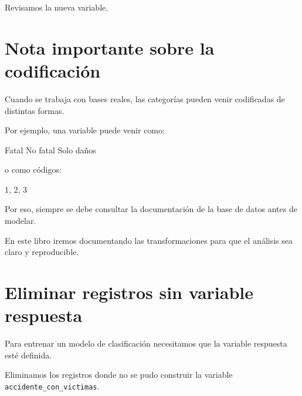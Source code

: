 \documentclass[
  11pt,
  letterpaper,
]{book}
\newenvironment{Shaded}{\begin{snugshade}}{\end{snugshade}}
\newcommand{\AttributeTok}[1]{\textcolor[rgb]{0.40,0.45,0.13}{#1}}
\newcommand{\ControlFlowTok}[1]{\textcolor[rgb]{0.00,0.23,0.31}{\textbf{#1}}}
\newcommand{\FunctionTok}[1]{\textcolor[rgb]{0.28,0.35,0.67}{#1}}
\newcommand{\NormalTok}[1]{\textcolor[rgb]{0.00,0.23,0.31}{#1}}
\newcommand{\SpecialCharTok}[1]{\textcolor[rgb]{0.37,0.37,0.37}{#1}}
\newcommand{\StringTok}[1]{\textcolor[rgb]{0.13,0.47,0.30}{#1}}
\begin{document}
Revisamos la nueva variable.

\begin{Shaded}
\end{Shaded}

\section{Nota importante sobre la
codificación}\label{nota-importante-sobre-la-codificaciuxf3n}

Cuando se trabaja con bases reales, las categorías pueden venir
codificadas de distintas formas.

Por ejemplo, una variable puede venir como:

\begin{Shaded}
\begin{Highlighting}[]
\NormalTok{Fatal}
\NormalTok{No fatal}
\NormalTok{Solo daños}
\end{Highlighting}
\end{Shaded}

o como códigos:

\begin{Shaded}
\begin{Highlighting}[]
\NormalTok{1, 2, 3}
\end{Highlighting}
\end{Shaded}

Por eso, siempre se debe consultar la documentación de la base de datos
antes de modelar.

En este libro iremos documentando las transformaciones para que el
análisis sea claro y reproducible.

\section{Eliminar registros sin variable
respuesta}\label{eliminar-registros-sin-variable-respuesta}

Para entrenar un modelo de clasificación necesitamos que la variable
respuesta esté definida.

Eliminamos los registros donde no se pudo construir la variable
\texttt{accidente\_con\_victimas}.
\end{document}
